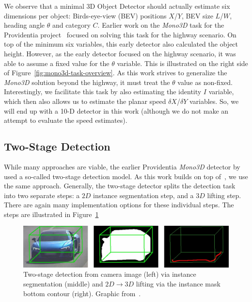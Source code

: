 We observe that a minimal 3D Object Detector should actually estimate six dimensions per object: Birds-eye-view (BEV) positions $X$/$Y$, BEV size $L$/$W$, heading angle $\theta$ and category $C$.
Earlier work on the \textit{Mono3D} task for the Providentia project~\cite{leonthesis} focused on solving this task for the highway scenario.
On top of the minimum six variables, this early detector also calculated the object height.
However, as the early detector focused on the highway scenario, it was able to assume a fixed value for the $\theta$ variable.
This is illustrated on the right side of Figure~\ref{fig:mono3d-task-overview}.
As this work strives to generalize the \textit{Mono3D} solution beyond the highway, it must treat the $\theta$ value as non-fixed.
Interestingly, we facilitate this task by also estimating the identity $I$ variable, which then also allows us to estimate the planar speed $\delta X$/$\delta Y$ variables.
So, we will end up with a 10-D detector in this work (although we do not make an attempt to evaluate the speed estimates).

\subsection{Two-Stage Detection}
\label{subsec:twostage}

While many approaches are viable, the earlier Providentia \textit{Mono3D} detector by~\cite{leonthesis} used a so-called two-stage detection model.
As this work builds on top of~\cite{leonthesis}, we use the same approach.
Generally, the two-stage detector splits the detection task into two separate steps: a $2D$ instance segmentation step, and a $3D$ lifting step.
There are again many implementation options for these individual steps.
The steps are illustrated in Figure~\ref{fig:mono3d-two-stage}

\begin{figure}[htb]
    \includegraphics[width=\linewidth]{figures/two-stage-detection}
    \caption{Two-stage detection from camera image (left) via instance segmentation (middle) and $2D \rightarrow 3D$ lifting via the instance mask bottom contour (right). Graphic from~\cite{leonthesis}.}
    \label{fig:mono3d-two-stage}
\end{figure}

